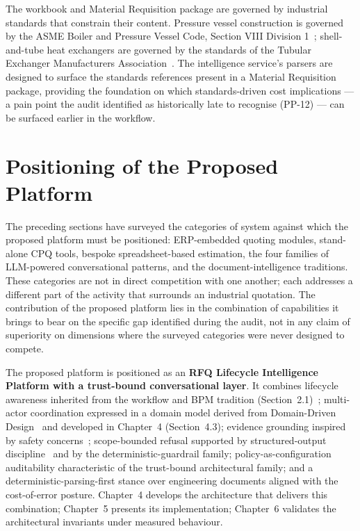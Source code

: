 The workbook and Material Requisition package are governed by industrial standards that constrain their content. Pressure vessel construction is governed by the ASME Boiler and Pressure Vessel Code, Section VIII Division 1~\cite{asme_bpvc_viii_div1_2025}; shell-and-tube heat exchangers are governed by the standards of the Tubular Exchanger Manufacturers Association~\cite{tema_standards_11ed}. The intelligence service's parsers are designed to surface the standards references present in a Material Requisition package, providing the foundation on which standards-driven cost implications --- a pain point the audit identified as historically late to recognise (PP-12) --- can be surfaced earlier in the workflow.

\section{Positioning of the Proposed Platform}
The preceding sections have surveyed the categories of system against which the proposed platform must be positioned: ERP-embedded quoting modules, stand-alone CPQ tools, bespoke spreadsheet-based estimation, the four families of LLM-powered conversational patterns, and the document-intelligence traditions. These categories are not in direct competition with one another; each addresses a different part of the activity that surrounds an industrial quotation. The contribution of the proposed platform lies in the combination of capabilities it brings to bear on the specific gap identified during the audit, not in any claim of superiority on dimensions where the surveyed categories were never designed to compete.

The proposed platform is positioned as an \textbf{RFQ Lifecycle Intelligence Platform with a trust-bound conversational layer}. It combines lifecycle awareness inherited from the workflow and BPM tradition (Section~2.1)~\cite{dumas2018bpm}; multi-actor coordination expressed in a domain model derived from Domain-Driven Design~\cite{evans2003ddd} and developed in Chapter~4 (Section~4.3); evidence grounding inspired by safety concerns~\cite{ji2023hallucination, bai2022constitutional, zheng2023judge}; scope-bounded refusal supported by structured-output discipline~\cite{anthropic_structured_outputs_docs} and by the deterministic-guardrail family; policy-as-configuration auditability characteristic of the trust-bound architectural family; and a deterministic-parsing-first stance over engineering documents aligned with the cost-of-error posture. Chapter~4 develops the architecture that delivers this combination; Chapter~5 presents its implementation; Chapter~6 validates the architectural invariants under measured behaviour.

